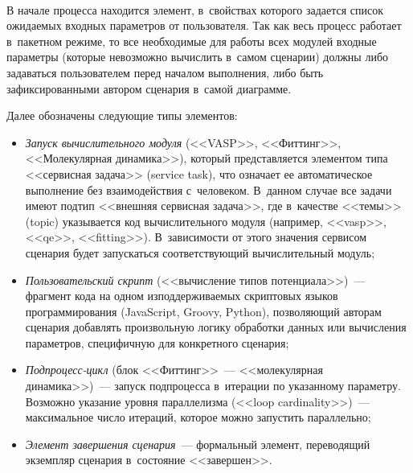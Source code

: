 \begin{multicols}{2}
    \begin{figure*} %
     \vspace*{1pt}
  \begin{center}  
    \mbox{%
\epsfxsize=147.834mm
}

\end{center}
\vspace*{-10pt}
    \vspace*{-7pt}
    \end{figure*}
    
     В начале процесса находится элемент, в~свойствах которого задается список 
ожидаемых входных параметров от пользователя. Так как весь процесс работает 
в~пакетном режиме, то все необходимые для работы всех модулей входные 
параметры (которые невозможно вы\-чис\-лить в~самом сценарии) долж\-ны либо 
задаваться пользователем перед началом выполнения, либо быть 
зафиксированными автором сценария в~самой диаграмме.
     
   Далее обозначены следующие типы элементов:
   \begin{itemize}
\item \textit{Запуск вычислительного модуля} (<<VASP>>, <<Фиттинг>>, 
<<Молекулярная динамика>>), который пред\-став\-ля\-ет\-ся элементом типа 
<<сервисная задача>> (service task), что означает ее автоматическое 
выполнение без взаимодействия с~человеком. В~данном случае все задачи 
имеют подтип <<внеш\-няя сервисная задача>>, где в~качестве <<темы>> (topic) 
указывается код вычислительного модуля (например, <<vasp>>, <<qe>>, 
<<fitting>>). В~за\-ви\-си\-мости от этого значения сервисом сценария будет 
запускаться со\-от\-вет\-ст\-ву\-ющий вы\-чис\-ли\-тель\-ный модуль;
\item \textit{Пользовательский скрипт} (<<вычисление типов  
потенциала>>)~--- фрагмент кода на одном из\linebreak поддерживаемых скриптовых 
языков программирования (JavaScript, Groovy, Python), позволяющий авторам 
сценария добавлять произвольную логику обработки данных или \mbox{вы\-чис\-ле\-ния} 
па\-ра\-мет\-ров, специфичную для конкретного сценария;
\item \textit{Подпроцесс-цикл} (блок <<Фиттинг>>~--- <<молекулярная 
динамика>>)~--- запуск подпроцесса в~итерации по указанному па\-ра\-мет\-ру. 
Возможно указание уровня параллелизма (<<loop cardinality>>)~--- 
максимальное число итераций, которое можно запустить параллельно;
\item \textit{Элемент завершения сценария}~--- формальный элемент, 
переводящий экземпляр сценария в~со\-сто\-яние <<завершен>>.
\end{itemize}
  

\end{multicols}

